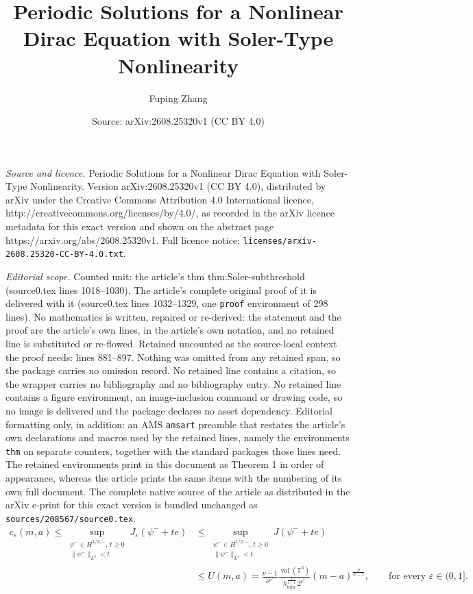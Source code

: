 \documentclass[10pt,a4paper]{amsart}
\title{Periodic Solutions for a Nonlinear Dirac Equation with Soler-Type Nonlinearity}
\author{Fuping Zhang}
\date{Source: arXiv:2608.25320v1 (CC BY 4.0)}
\newcommand{\eps}{\varepsilon}
\begin{document}
\maketitle

\noindent\emph{Source and licence.} Periodic Solutions for a Nonlinear Dirac Equation with Soler-Type Nonlinearity. Version arXiv:2608.25320v1 (CC BY 4.0), distributed by arXiv under the Creative Commons Attribution 4.0 International licence, http://creativecommons.org/licenses/by/4.0/, as recorded in the arXiv licence metadata for this exact version and shown on the abstract page https://arxiv.org/abs/2608.25320v1. Full licence notice: \texttt{licenses/arxiv-2608.25320-CC-BY-4.0.txt}.\par\smallskip

\noindent\textit{Editorial scope.} Counted unit: the article's thm thm:Soler-subthreshold (source0.tex lines 1018--1030). The article's complete original proof of it is delivered with it (source0.tex lines 1032--1329, one \texttt{proof} environment of 298 lines). No mathematics is written, repaired or re-derived: the statement and the proof are the article's own lines, in the article's own notation, and no retained line is substituted or re-flowed.  Retained uncounted as the source-local context the proof needs: lines 881--897.  Nothing was omitted from any retained span, so the package carries no omission record.  No retained line contains a citation, so the wrapper carries no bibliography and no bibliography entry.  No retained line contains a figure environment, an image-inclusion command or drawing code, so no image is delivered and the package declares no asset dependency.  Editorial formatting only, in addition: an AMS \texttt{amsart} preamble that restates the article's own declarations and macros used by the retained lines, namely the environments \texttt{thm} on separate counters, together with the standard packages those lines need.  The retained environments print in this document as Theorem 1 in order of appearance, whereas the article prints the same items with the numbering of its own full document.  The complete native source of the article as distributed in the arXiv e-print for this exact version is bundled unchanged as \texttt{sources/208567/source0.tex}.
\begin{align}\label{eq:uniform estimate for perturbation}
c_\eps(m,a)
\leq
\sup_{\substack{\psi^-\in H^{1/2,-},\,t\ge0\\
\|\psi^-\|_{L^2}<t}}
J_\eps(\psi^-+te)
&\leq
\sup_{\substack{\psi^-\in H^{1/2,-},\,t\ge0\\
\|\psi^-\|_{L^2}<t}}
J(\psi^-+te)\\
&\leq U(m,a)=
\frac{\nu-1}{\nu^{\nu^*}}
\frac{\operatorname{vol}(\mathbb T^3)}
{h_{\min}^{\frac1{\nu-1}}\,2^{\nu^*}}
(m-a)^{\frac{\nu}{\nu-1}},
\qquad\text{for every }\eps\in(0,1].
\end{align}
\end{document}
